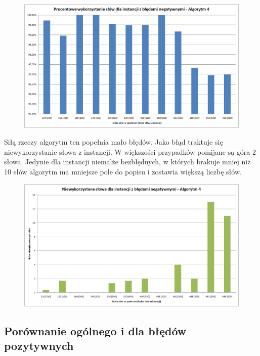 \documentclass[a4paper,10pt]{article}
\begin{document}
\begin{figure}[h]
  \footnotesize\centering
  \includegraphics[width=\textwidth,keepaspectratio]{percentageUsedWords_negative.png}
\end{figure}

Siłą rzeczy algorytm ten popełnia mało błędów. Jako błąd traktuje się niewykorzystanie słowa z instancji. W większości przypadków pomijane są góra 2 słowa. Jedynie dla instancji niemalże bezbłędnych, w których brakuje mniej niż 10 słów algorytm ma mniejsze pole do popisu i zostawia większą liczbę słów.

\begin{figure}[h]
  \footnotesize\centering
  \includegraphics[width=\textwidth,keepaspectratio]{unusedWords_negative.png}
\end{figure}

\subsection{Porównanie ogólnego i dla błędów pozytywnych}
\end{document}
